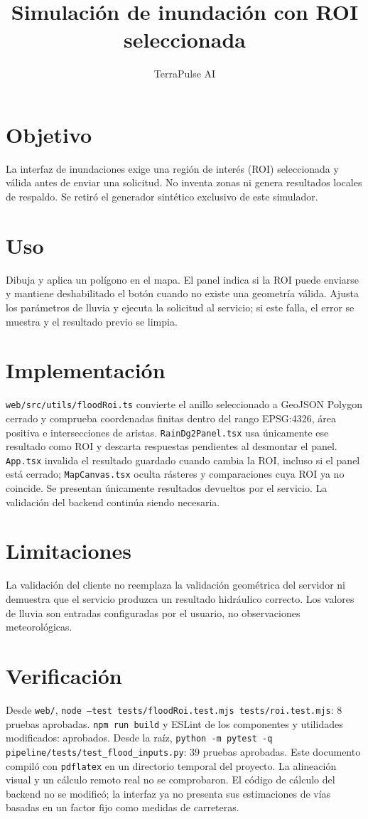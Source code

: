 \documentclass[12pt]{article}
\title{Simulación de inundación con ROI seleccionada}
\author{TerraPulse AI}
\date{}
\begin{document}
\maketitle

\section{Objetivo}
La interfaz de inundaciones exige una región de interés (ROI) seleccionada y válida antes de enviar una solicitud. No inventa zonas ni genera resultados locales de respaldo. Se retiró el generador sintético exclusivo de este simulador.

\section{Uso}
Dibuja y aplica un polígono en el mapa. El panel indica si la ROI puede enviarse y mantiene deshabilitado el botón cuando no existe una geometría válida. Ajusta los parámetros de lluvia y ejecuta la solicitud al servicio; si este falla, el error se muestra y el resultado previo se limpia.

\section{Implementación}
\texttt{web/src/utils/floodRoi.ts} convierte el anillo seleccionado a GeoJSON Polygon cerrado y comprueba coordenadas finitas dentro del rango EPSG:4326, área positiva e intersecciones de aristas. \texttt{RainDg2Panel.tsx} usa únicamente ese resultado como ROI y descarta respuestas pendientes al desmontar el panel. \texttt{App.tsx} invalida el resultado guardado cuando cambia la ROI, incluso si el panel está cerrado; \texttt{MapCanvas.tsx} oculta rásteres y comparaciones cuya ROI ya no coincide. Se presentan únicamente resultados devueltos por el servicio. La validación del backend continúa siendo necesaria.

\section{Limitaciones}
La validación del cliente no reemplaza la validación geométrica del servidor ni demuestra que el servicio produzca un resultado hidráulico correcto. Los valores de lluvia son entradas configuradas por el usuario, no observaciones meteorológicas.

\section{Verificación}
Desde \texttt{web/}, \texttt{node --test tests/floodRoi.test.mjs tests/roi.test.mjs}: 8 pruebas aprobadas. \texttt{npm run build} y ESLint de los componentes y utilidades modificados: aprobados. Desde la raíz, \verb|python -m pytest -q pipeline/tests/test_flood_inputs.py|: 39 pruebas aprobadas. Este documento compiló con \texttt{pdflatex} en un directorio temporal del proyecto. La alineación visual y un cálculo remoto real no se comprobaron. El código de cálculo del backend no se modificó; la interfaz ya no presenta sus estimaciones de vías basadas en un factor fijo como medidas de carreteras.
\end{document}
